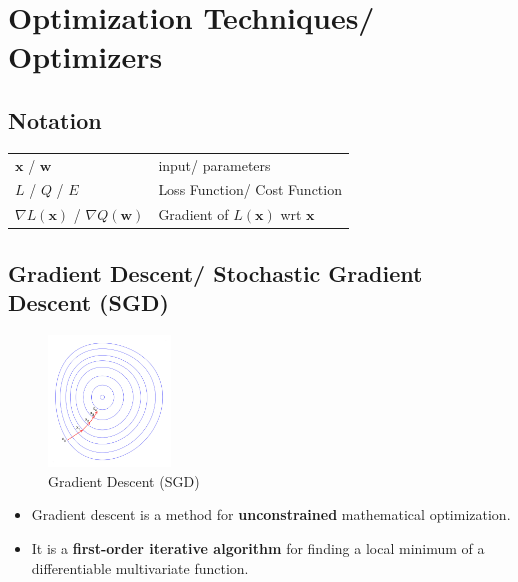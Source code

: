 \chapter{Optimization Techniques/ Optimizers}

\section*{Notation}

\begin{table}[h]
    \begin{tabular}{l l}
        $\mathbf{x}$ / $\mathbf{w}$ & input/ parameters \\
        
        $L$ / $Q$ / $E$ & Loss Function/ Cost Function \\

        $\nabla L(\mathbf{x})$ / $\nabla Q(\mathbf{w})$ & Gradient of $L(\mathbf{x})$ wrt $\mathbf{x}$ \\
    \end{tabular}
\end{table}


\section{Gradient Descent/ Stochastic Gradient Descent (SGD) \cite{wiki-Gradient_descent,wiki-Stochastic_gradient_descent}}\label{Gradient Descent (GD)}\label{Stochastic Gradient Descent (SGD)}

\begin{table}[h]
    \begin{minipage}[t]{0.5\linewidth}
        \begin{figure}[H]
            \centering
            \includegraphics[width=\linewidth, height=3.5cm, keepaspectratio]{Pictures/optimizers/Gradient_descent.jpg}
            \caption{Gradient Descent (SGD)}
        \end{figure}
    \end{minipage}
    \hfill
    \begin{minipage}[t]{0.5\linewidth}
        \begin{itemize}
            \item Gradient descent is a method for \textbf{unconstrained} mathematical optimization. 
            
            \item It is a \textbf{first-order iterative algorithm} for finding a local minimum of a differentiable multivariate function.
        \end{itemize}        
    \end{minipage}
\end{table}

